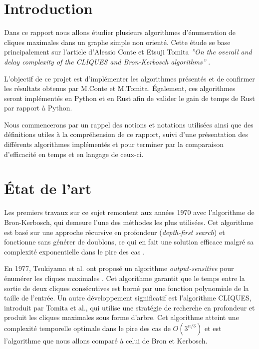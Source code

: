 \documentclass[12pt,a4paper]{article}
\begin{document}
\tableofcontents

\newpage

\section{Introduction}


Dans ce rapport nous allons étudier plusieurs algorithmes d'énumeration de cliques maximales dans un graphe simple non orienté. Cette étude se base principalement sur l'article d'Alessio Conte et Etsuji Tomita  \textit{''On the overall and delay complexity of the CLIQUES and Bron-Kerbosch algorithms''} \cite{CONTE20221}.

L'objectif de ce projet est d'implémenter les algorithmes présentés et de confirmer les résultats obtenus par M.Conte et M.Tomita. Également, ces algorithmes seront implémentés en Python et en Rust afin de valider le gain de temps de Rust par rapport à Python.

Nous commencerons par un rappel des notions et notations utilisées ainsi que des définitions utiles à la compréhension de ce rapport, suivi d'une présentation des différents algorithmes implémentés et pour terminer par la comparaison d'efficacité en temps et en langage de ceux-ci.


\section{État de l'art}%
\label{sec:etat}
Les premiers travaux sur ce sujet remontent aux années 1970 avec l'algorithme de Bron-Kerbosch\cite{bron1973algorithm}, qui demeure l'une des méthodes les plus utilisées. Cet algorithme est basé sur une approche récursive en profondeur (\textit{depth-first search}) et fonctionne sans générer de doublons, ce qui en fait une solution efficace malgré sa complexité exponentielle dans le pire des cas .

En 1977, Tsukiyama et al. ont proposé un algorithme \emph{output-sensitive} pour énumérer les cliques maximales \cite{tsukiyama1977new}. Cet algorithme garantit que le temps entre la sortie de deux cliques consécutives est borné par une fonction polynomiale de la taille de l'entrée. Un autre développement significatif est l'algorithme CLIQUES, introduit par Tomita et al., qui utilise une stratégie de recherche en profondeur et produit les cliques maximales sous forme d'arbre. Cet algorithme atteint une complexité temporelle optimale dans le pire des cas de \(O(3^{n/3})\) et est l'algorithme que nous allons comparé à celui de Bron et Kerbosch.
\end{document}

